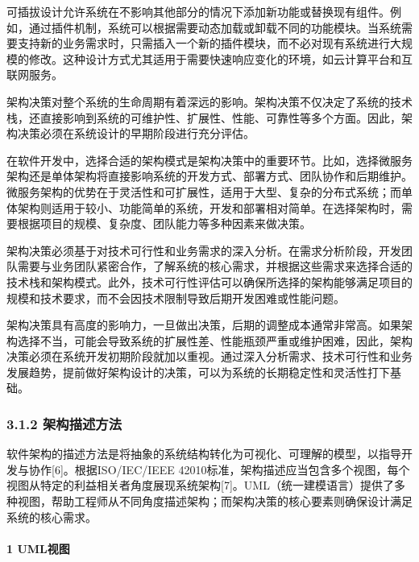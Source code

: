 可插拔设计允许系统在不影响其他部分的情况下添加新功能或替换现有组件。例如，通过插件机制，系统可以根据需要动态加载或卸载不同的功能模块。当系统需要支持新的业务需求时，只需插入一个新的插件模块，而不必对现有系统进行大规模的修改。这种设计方式尤其适用于需要快速响应变化的环境，如云计算平台和互联网服务。


架构决策对整个系统的生命周期有着深远的影响。架构决策不仅决定了系统的技术栈，还直接影响到系统的可维护性、扩展性、性能、可靠性等多个方面。因此，架构决策必须在系统设计的早期阶段进行充分评估。

在软件开发中，选择合适的架构模式是架构决策中的重要环节。比如，选择微服务架构还是单体架构将直接影响系统的开发方式、部署方式、团队协作和后期维护。微服务架构的优势在于灵活性和可扩展性，适用于大型、复杂的分布式系统；而单体架构则适用于较小、功能简单的系统，开发和部署相对简单。在选择架构时，需要根据项目的规模、复杂度、团队能力等多种因素来做决策。

架构决策必须基于对技术可行性和业务需求的深入分析。在需求分析阶段，开发团队需要与业务团队紧密合作，了解系统的核心需求，并根据这些需求来选择合适的技术栈和架构模式。此外，技术可行性评估可以确保所选择的架构能够满足项目的规模和技术要求，而不会因技术限制导致后期开发困难或性能问题。

架构决策具有高度的影响力，一旦做出决策，后期的调整成本通常非常高。如果架构选择不当，可能会导致系统的扩展性差、性能瓶颈严重或维护困难，因此，架构决策必须在系统开发初期阶段就加以重视。通过深入分析需求、技术可行性和业务发展趋势，提前做好架构设计的决策，可以为系统的长期稳定性和灵活性打下基础。

\hypertarget{ux67b6ux6784ux63cfux8ff0ux65b9ux6cd5}{%
\subsubsection{3.1.2 架构描述方法}\label{ux67b6ux6784ux63cfux8ff0ux65b9ux6cd5}}

软件架构的描述方法是将抽象的系统结构转化为可视化、可理解的模型，以指导开发与协作{[}6{]}。根据ISO/IEC/IEEE 42010标准，架构描述应当包含多个视图，每个视图从特定的利益相关者角度展现系统架构{[}7{]}。UML（统一建模语言）提供了多种视图，帮助工程师从不同角度描述架构；而架构决策的核心要素则确保设计满足系统的核心需求。

\hypertarget{umlux89c6ux56fe}{%
\paragraph{1 UML视图}\label{umlux89c6ux56fe}}

